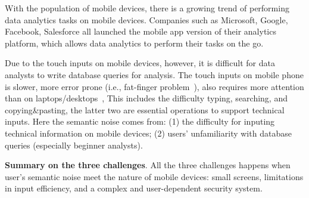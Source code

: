 With the population of mobile devices, there is a growing trend of performing data analytics tasks on mobile devices. Companies such as Microsoft, Google, Facebook, Salesforce all launched the mobile app version of their analytics platform, which allows data analytics to perform their tasks on the go. 

Due to the touch inputs on mobile devices, however, it is difficult for data analysts to write database queries for analysis. The touch inputs on mobile phone is slower, more error prone (i.e., fat-finger problem~\cite{siek2005fat}), also requires more attention than on laptops/desktops~\cite{mobiletyping}, This includes the difficulty typing, searching, and copying\&pasting, the latter two are essential operations to support technical inputs. Here the semantic noise comes from: (1) the difficulty for inputing technical information on mobile devices; (2) users' unfamiliarity with database queries (especially beginner analysts). 

\textbf{ Summary on the three challenges}. All the three challenges happens when user's semantic noise meet the nature of mobile devices: small screens, limitations in input efficiency, and a complex and user-dependent security system.